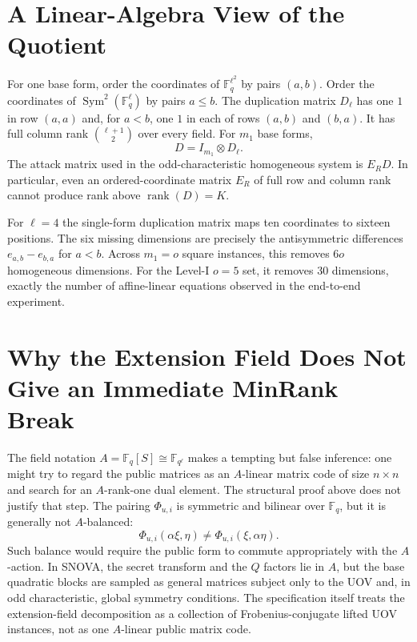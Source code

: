 \documentclass[11pt]{article}
\newcommand{\F}{\mathbb F}
\newcommand{\Sym}{\operatorname{Sym}}
\newcommand{\rank}{\operatorname{rank}}
\newcommand{\SNOVA}{\textsf{SNOVA}}
\begin{document}
\section{A Linear-Algebra View of the Quotient}\label{app:linear}

For one base form, order the coordinates of $\F_q^{\ell^2}$ by pairs $(a,b)$.  Order the coordinates of $\Sym^2(\F_q^\ell)$ by pairs $a\le b$.  The duplication matrix $D_\ell$ has one $1$ in row $(a,a)$ and, for $a<b$, one $1$ in each of rows $(a,b)$ and $(b,a)$.  It has full column rank $\binom{\ell+1}{2}$ over every field.  For $m_1$ base forms,
\[
 D=I_{m_1}\otimes D_\ell.
\]
The attack matrix used in the odd-characteristic homogeneous system is $E_RD$.  In particular, even an ordered-coordinate matrix $E_R$ of full row and column rank cannot produce rank above $\rank(D)=K$.

For $\ell=4$ the single-form duplication matrix maps ten coordinates to sixteen positions.  The six missing dimensions are precisely the antisymmetric differences $e_{a,b}-e_{b,a}$ for $a<b$.  Across $m_1=o$ square instances, this removes $6o$ homogeneous dimensions.  For the Level-I $o=5$ set, it removes 30 dimensions, exactly the number of affine-linear equations observed in the end-to-end experiment.

\section{Why the Extension Field Does Not Give an Immediate MinRank Break}\label{app:noAshortcut}

The field notation $A=\F_q[S]\cong\F_{q^\ell}$ makes a tempting but false
inference: one might try to regard the public matrices as an $A$-linear matrix
code of size $n\times n$ and search for an $A$-rank-one dual element.  The
structural proof above does not justify that step.  The pairing
$\Phi_{u,i}$ is symmetric and bilinear over $\F_q$, but it is generally not
$A$-balanced:
\[
 \Phi_{u,i}(\alpha\xi,\eta)
 \ne
 \Phi_{u,i}(\xi,\alpha\eta).
\]
Such balance would require the public form to commute appropriately with the
$A$-action.  In \SNOVA{}, the secret transform and the $Q$ factors lie in
$A$, but the base quadratic blocks are sampled as general matrices subject
only to the UOV and, in odd characteristic, global symmetry conditions.  The
specification itself treats the extension-field decomposition as a collection
of Frobenius-conjugate lifted UOV instances, not as one $A$-linear public
matrix code.
\end{document}
